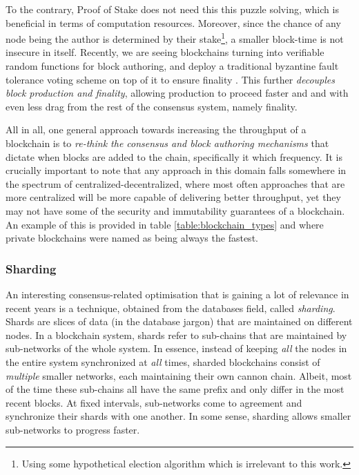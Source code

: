 To the contrary, Proof of Stake does not need this this puzzle solving, which is beneficial in terms
of computation resources. Moreover, since the chance of any node being the author is determined by
their stake\footnote{Using some hypothetical election algorithm which is irrelevant to this work.},
a smaller block-time is not insecure in itself. Recently, we are seeing blockchains turning into
verifiable random functions \cite{dodisVerifiableRandomFunction2005} for block authoring, and deploy
a traditional byzantine fault tolerance voting scheme on top of it to ensure finality
\cite{buterinCasperFriendlyFinality2019, stewartPosterGRANDPAFinality2019}. This further
\textit{decouples block production and finality}, allowing production to proceed faster and and with
even less drag from the rest of the consensus system, namely finality.

All in all, one general approach towards increasing the throughput of a blockchain is to
\textit{re-think the consensus and block authoring mechanisms} that dictate when blocks are added to
the chain, specifically it which frequency. It is crucially important to note that any approach in
this domain falls somewhere in the spectrum of centralized-decentralized, where most often
approaches that are more centralized will be more capable of delivering better throughput, yet they
may not have some of the security and immutability guarantees of a blockchain. An example of this is
provided in table \ref{table:blockchain_types} and where private blockchains were named as being
always the fastest.

\subsubsection{Sharding}

An interesting consensus-related optimisation that is gaining a lot of relevance in recent years is
a technique, obtained from the databases field, called \textit{sharding}. Shards are slices of data
(in the database jargon) that are maintained on different nodes. In a blockchain system, shards
refer to sub-chains that are maintained by sub-networks of the whole system. In essence, instead of
keeping \textit{all} the nodes in the entire system synchronized at \textit{all} times, sharded
blockchains consist of \textit{multiple} smaller networks, each maintaining their own cannon chain.
Albeit, most of the time these sub-chains all have the same prefix and only differ in the most
recent blocks. At fixed intervals, sub-networks come to agreement and synchronize their shards with
one another. In some sense, sharding allows smaller sub-networks to progress
faster\cite{forestierBlockcliqueScalingBlockchains2019, al-bassamChainspaceShardedSmart2017,
shreyDiPETransFrameworkDistributed2019}.

